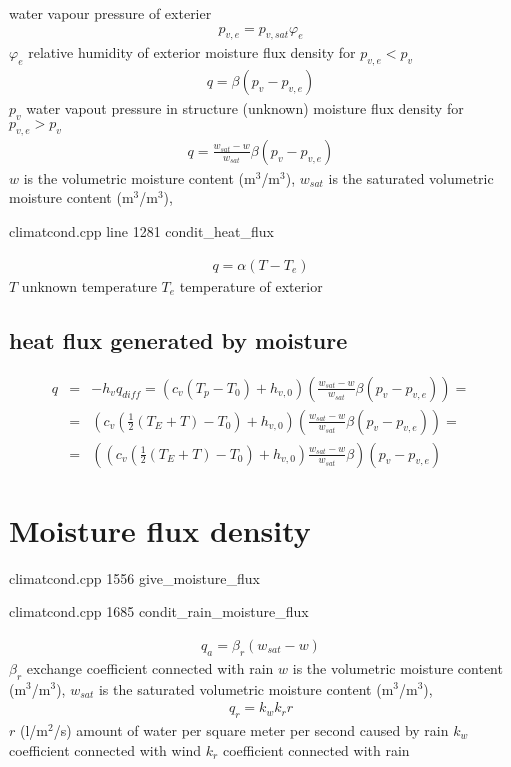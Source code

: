 water vapour pressure of exterier
\begin{eqnarray}
p_{v,e} = p_{v,sat} \varphi_{e}
\end{eqnarray}
$\varphi_{e}$ relative humidity of exterior
moisture flux density for $p_{v,e}<p_v$
\begin{eqnarray}
q = \beta (p_v - p_{v,e})
\end{eqnarray}
$p_v$ water vapout pressure in structure (unknown)
moisture flux density for $p_{v,e}>p_v$
\begin{eqnarray}
q = \frac{w_{sat} - w}{w_{sat}}\beta (p_v - p_{v,e})
\end{eqnarray}
$w$ is the volumetric moisture content (m$^3$/m$^3$),
$w_{sat}$ is the saturated volumetric moisture content (m$^3$/m$^3$),

climatcond.cpp line 1281
condit\_heat\_flux

\begin{eqnarray}
q = \alpha (T - T_e)
\end{eqnarray}
$T$ unknown temperature
$T_e$ temperature of exterior

\subsection{heat flux generated by moisture}

\begin{eqnarray}
q &=& - h_v q_{diff} = (c_v (T_p-T_0) + h_{v,0}) \left(\frac{w_{sat} - w}{w_{sat}}\beta (p_v - p_{v,e})\right) =
\\
&=& \left(c_v (\frac{1}{2}(T_E + T)-T_0) + h_{v,0}\right)\left(\frac{w_{sat} - w}{w_{sat}}\beta (p_v - p_{v,e})\right) =
\\
&=& \left((c_v (\frac{1}{2}(T_E + T)-T_0) + h_{v,0})\frac{w_{sat} - w}{w_{sat}}\beta\right)(p_v - p_{v,e})
\end{eqnarray}


\section{Moisture flux density}

climatcond.cpp 1556
give\_moisture\_flux 

climatcond.cpp 1685
condit\_rain\_moisture\_flux

\begin{eqnarray}
q_a = \beta_r (w_{sat}-w)
\end{eqnarray}
$\beta_r$ exchange coefficient connected with rain
$w$ is the volumetric moisture content (m$^3$/m$^3$),
$w_{sat}$ is the saturated volumetric moisture content (m$^3$/m$^3$),
\begin{eqnarray}
q_r = k_w k_r r
\end{eqnarray}
$r$ (l/m$^2$/s) amount of water per square meter per second caused by rain
$k_w$ coefficient connected with wind
$k_r$ coefficient connected with rain

